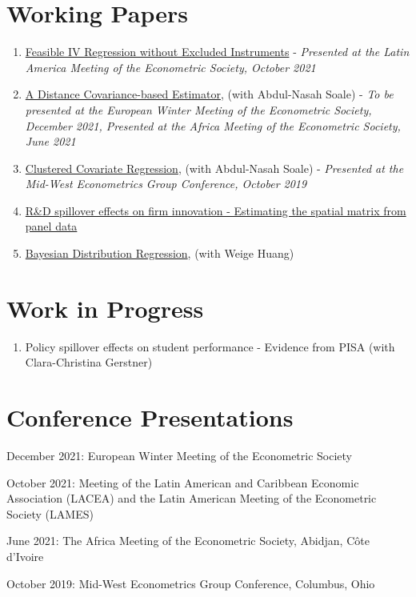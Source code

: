 \documentclass[12pt,letterpaper]{article}
\renewenvironment{itemize}{
  \begin{list}{}{
    \setlength{\leftmargin}{1.5em}
  }
}{
  \end{list}
}
\begin{document}
\section*{Working Papers}
\begin{enumerate}
	\item \href{https://arxiv.org/pdf/2103.09621.pdf?}{Feasible IV Regression without Excluded Instruments} - \textit{Presented at the Latin America Meeting of the Econometric Society, October 2021}
	
	\item \href{https://arxiv.org/pdf/2102.07008.pdf}{A Distance Covariance-based Estimator}, (with Abdul-Nasah Soale) - \textit{To be presented at the European Winter Meeting of the Econometric Society, December 2021, Presented at the Africa Meeting of the Econometric Society, June 2021}
	
	\item \href{https://papers.ssrn.com/sol3/papers.cfm?abstract_id=3394012}{Clustered Covariate Regression}, (with Abdul-Nasah Soale) - \textit{Presented at the Mid-West Econometrics Group Conference, October 2019}
	
		\item  \href{https://estsyawo.github.io/Tsyawo_JMP.pdf#}{R\&D spillover effects on firm innovation - Estimating the spatial matrix from panel data}
	
	\item \href{https://papers.ssrn.com/sol3/papers.cfm?abstract_id=3048658}{Bayesian Distribution Regression}, (with Weige Huang)
\end{enumerate}

\section*{Work in Progress}
\begin{enumerate}
	\item Policy spillover effects on student performance - Evidence from PISA (with Clara-Christina Gerstner)
\end{enumerate}

\section*{Conference Presentations}
\begin{itemize}
  \item December 2021: European Winter Meeting of the Econometric Society
  \item October 2021: Meeting of the Latin American and Caribbean Economic Association (LACEA) and the Latin American Meeting of the Econometric Society (LAMES)
	\item June 2021: The Africa Meeting of the Econometric Society, Abidjan, C\^ote d'Ivoire
	\item October 2019: Mid-West Econometrics Group Conference, Columbus, Ohio
\end{itemize}
\end{document}
